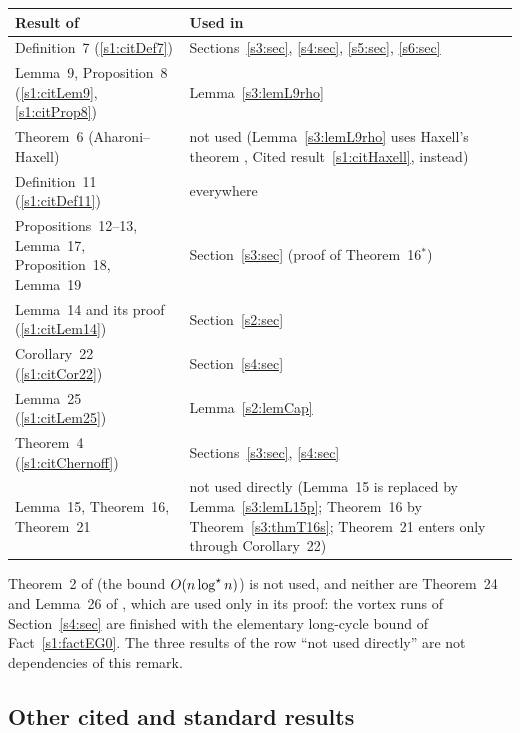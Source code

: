 \begin{remark}\label{s1:remBMused}
\begin{center}
\small
\begin{tabular}{p{6.2cm}p{8.6cm}}
\textbf{Result of \cite{BM}} & \textbf{Used in}\\
\hline
Definition~7 (\ref{s1:citDef7}) & Sections~\ref{s3:sec}, \ref{s4:sec}, \ref{s5:sec}, \ref{s6:sec}\\
Lemma~9, Proposition~8 (\ref{s1:citLem9}, \ref{s1:citProp8}) & Lemma~\ref{s3:lemL9rho}\\
Theorem~6 (Aharoni--Haxell) & not used (Lemma~\ref{s3:lemL9rho} uses Haxell's theorem \cite{Hax95}, Cited result~\ref{s1:citHaxell}, instead)\\
Definition~11 (\ref{s1:citDef11}) & everywhere\\
Propositions~12--13, Lemma~17, Proposition~18, Lemma~19 & Section~\ref{s3:sec} (proof of Theorem~16$^*$)\\
Lemma~14 and its proof (\ref{s1:citLem14}) & Section~\ref{s2:sec}\\
Corollary~22 (\ref{s1:citCor22}) & Section~\ref{s4:sec}\\
Lemma~25 (\ref{s1:citLem25}) & Lemma~\ref{s2:lemCap}\\
Theorem~4 (\ref{s1:citChernoff}) & Sections~\ref{s3:sec}, \ref{s4:sec}\\
Lemma~15, Theorem~16, Theorem~21 & not used directly (Lemma~15 is replaced by Lemma~\ref{s3:lemL15p}; Theorem~16 by Theorem~\ref{s3:thmT16s}; Theorem~21 enters only through Corollary~22)\\
\hline
\end{tabular}
\end{center}
Theorem~2 of \cite{BM} (the bound $O(n\log^{\star} n)$) is not used, and neither are
Theorem~24 and Lemma~26 of \cite{BM}, which are used only in its proof: the vortex runs
of Section~\ref{s4:sec} are finished with the elementary long-cycle bound of
Fact~\ref{s1:factEG0}.
The three results of the row ``not used directly'' are not dependencies of this
remark.
\end{remark}

\subsection{Other cited and standard results}\label{s1:ssecOther}

